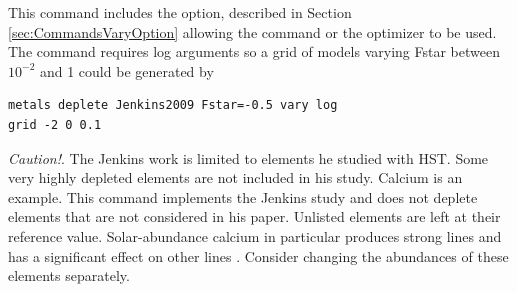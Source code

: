 This command includes the  option, described in Section \ref{sec:CommandsVaryOption}
allowing the  command
 or the  optimizer to be used.
 The   command requires log arguments so a grid of models
 varying Fstar between $10^{-2}$ and 1 could be generated by
 \begin{verbatim}
metals deplete Jenkins2009 Fstar=-0.5 vary log
grid -2 0 0.1 
\end{verbatim}
 
 {\color{red}
 \emph{Caution!}.  The Jenkins work is limited to elements he studied with HST.  
 Some very highly depleted elements are not included in his study.
 Calcium is an example.  
 This command implements the Jenkins study and does not
 deplete elements that are not considered in his paper.  
Unlisted elements are left at their reference value.  
Solar-abundance calcium in particular produces strong lines and has a significant
effect on other lines \citep{KingdonFerlandFeibelman1995}.
 Consider changing the abundances of these elements separately.
 }
